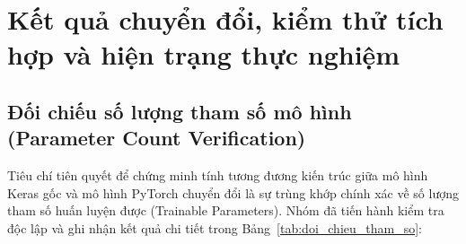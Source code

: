 \chapter{Kết quả chuyển đổi, kiểm thử tích hợp và hiện trạng thực nghiệm}\label{ch:evidence}

\section{Đối chiếu số lượng tham số mô hình (Parameter Count Verification)}
Tiêu chí tiên quyết để chứng minh tính tương đương kiến trúc giữa mô hình Keras gốc và mô hình PyTorch chuyển đổi là sự trùng khớp chính xác về số lượng tham số huấn luyện được (Trainable Parameters). Nhóm đã tiến hành kiểm tra độc lập và ghi nhận kết quả chi tiết trong Bảng~\ref{tab:doi_chieu_tham_so}:

